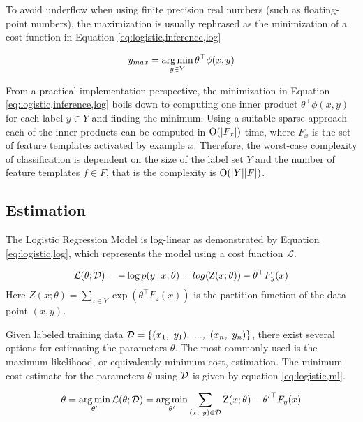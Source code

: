 To avoid underflow when using finite precision real numbers (such as
floating-point numbers), the maximization is usually rephrased as the
minimization of a cost-function in Equation
\ref{eq:logistic,inference,log}

\begin{equation}y_{max} = \operatorname*{arg\,min}_{y\in Y} \theta^\top \phi(x,y)\label{eq:logistic,inference,log}\end{equation}

From a practical implementation perspective, the minimization in
Equation \ref{eq:logistic,inference,log} boils down to computing one
inner product $\theta^\top \phi(x,y)$ for each label $y \in Y$ and
finding the minimum. Using a suitable sparse approach each of the
inner products can be computed in $\mbox{${\rm O}$}(|F_x|)$ time, where $F_x$ is the
set of feature templates activated by example $x$. Therefore, the
worst-case complexity of classification is dependent on the size of
the label set $Y$ and the number of feature templates $f \in F$, that
is the complexity is $\mbox{${\rm O}$}(|Y||F|)$.

\subsection{Estimation}
The Logistic Regression Model is log-linear as demonstrated by
Equation \ref{eq:logistic,log}, which represents the model using a
cost function $\mathcal{L}$.

\begin{equation}
\mathcal{L}(\theta\mbox{$ ; \, $}\mathcal{D}) = -\log p(y\mbox{$ \, | \, $} x\mbox{$ ; \, $} \theta) = log(\mbox{${\rm Z}$}(x;\theta)) - \theta^\top F_y(x)\label{eq:logistic,log}
\end{equation}
Here $Z(x;\theta) = \sum_{z \in Y}\exp(\theta^\top F_{z}(x))$ is the partition function of the data point $(x,y)$.

Given labeled training data $\mbox{${\mathcal{D}}$} = \{(x_1,\ y_1),\ ...,\
(x_n,\ y_n)\}$, there exist several options for estimating the
parameters $\theta$. The most commonly used is the maximum likelihood,
or equivalently minimum cost, estimation. The minimum cost estimate
for the parameters $\theta$ using $\mbox{${\mathcal{D}}$}$ is given by equation
\eqref{eq:logistic,ml}.

\begin{equation}
\theta = \operatorname*{arg\,min}_{\theta'} \mathcal{L}(\theta\mbox{$ ; \, $} \mathcal{D}) = \operatorname*{arg\,min}_{\theta'}\sum_{(x,\ y) \in \mathcal{D}} \mbox{${\rm Z}$}(x\mbox{$ ; \, $} \theta) - {\theta'}^\top F_y(x)\label{eq:logistic,ml}
\end{equation}

